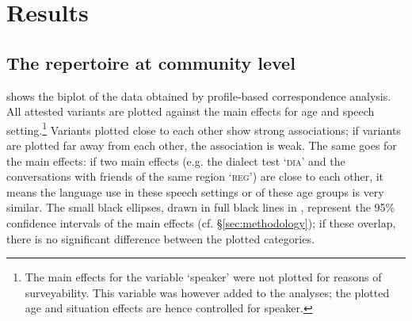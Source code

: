 \documentclass[output=paper]{LSP/langsci}
\begin{document}
\section{Results}
\label{sec:results}

\subsection{The repertoire at community level}
\label{sec:repertoirecommunity}

 shows the biplot of the data obtained by profile-based correspondence analysis. All attested variants are plotted against the main effects for age and speech setting.\footnote{The main effects for the variable ‘speaker’ were not plotted for reasons of surveyability. This variable was however added to the analyses; the plotted age and situation effects are hence controlled for speaker.} Variants plotted close to each other show strong associations; if variants are plotted far away from each other, the association is weak. The same goes for the main effects: if two main effects (e.g. the dialect test ‘\textsc{dia’} and the conversations with friends of the same region ‘\textsc{reg’}) are close to each other, it means the language use in these speech settings or of these age groups is very similar. The small black ellipses, drawn in full black lines in , represent the 95\% confidence intervals of the main effects (cf. §\ref{sec:methodology}); if these overlap, there is no significant difference between the plotted categories. 
\end{document}
